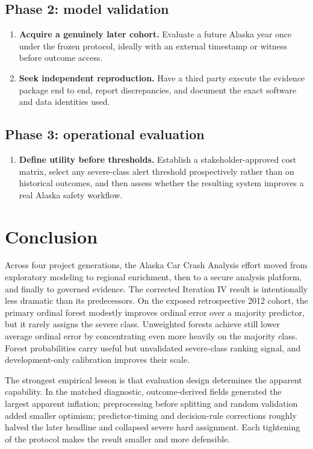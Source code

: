 \documentclass[11pt,letterpaper]{article}
\newcommand{\projectname}{Alaska Car Crash Analysis}
\begin{document}
\subsection*{Phase 2: model validation}
\begin{enumerate}[resume=roadmap]
  \item \textbf{Acquire a genuinely later cohort.} Evaluate a future Alaska year once under the frozen protocol, ideally with an external timestamp or witness before outcome access.
  \item \textbf{Seek independent reproduction.} Have a third party execute the evidence package end to end, report discrepancies, and document the exact software and data identities used.
\end{enumerate}

\subsection*{Phase 3: operational evaluation}
\begin{enumerate}[resume=roadmap]
  \item \textbf{Define utility before thresholds.} Establish a stakeholder-approved cost matrix, select any severe-class alert threshold prospectively rather than on historical outcomes, and then assess whether the resulting system improves a real Alaska safety workflow.
\end{enumerate}

\clearpage
\section{Conclusion}
Across four project generations, the \projectname{} effort moved from exploratory modeling to regional enrichment, then to a secure analysis platform, and finally to governed evidence. The corrected Iteration IV result is intentionally less dramatic than its predecessors. On the exposed retrospective 2012 cohort, the primary ordinal forest modestly improves ordinal error over a majority predictor, but it rarely assigns the severe class. Unweighted forests achieve still lower average ordinal error by concentrating even more heavily on the majority class. Forest probabilities carry useful but unvalidated severe-class ranking signal, and development-only calibration improves their scale.

The strongest empirical lesson is that evaluation design determines the apparent capability. In the matched diagnostic, outcome-derived fields generated the largest apparent inflation; preprocessing before splitting and random validation added smaller optimism; predictor-timing and decision-rule corrections roughly halved the later headline and collapsed severe hard assignment. Each tightening of the protocol makes the result smaller and more defensible.
\end{document}
